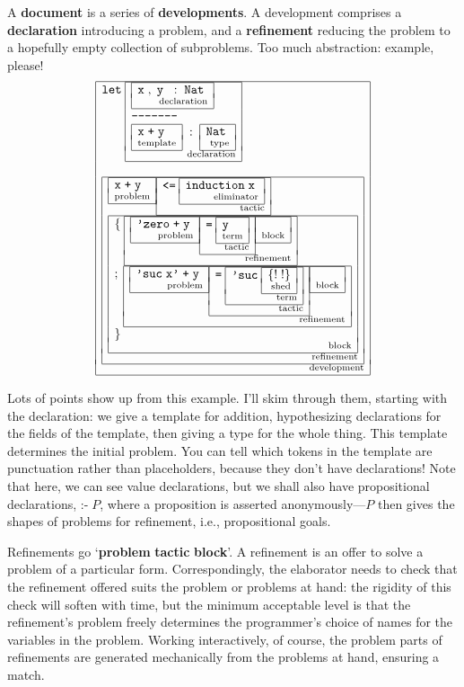 \documentclass{article}
\begin{document}
A \textbf{document} is a series of \textbf{developments}. A
development comprises a \textbf{declaration} introducing a problem,
and a \textbf{refinement} reducing the problem to a hopefully
empty collection of subproblems. Too much abstraction: example, please!
\newcommand{\capbox}[2]{\raisebox{0.12in}{\begin{array}[t]{|l|}\hline
      #1 \vspace*{-0.05in}\\
    \hfill\mbox{\scriptsize{#2}} \\ \hline\end{array}}}
\newcommand{\Ts}[1]{\texttt{#1}\;}
\newcommand{\co}{\;:\;}
\newcommand{\sco}{;\;\;}
\newcommand{\cm}{,\;}
\[
\capbox{
  \Ts{let}
    \capbox{
      \capbox{\Ts{x} \cm \Ts{y}\co \Ts{Nat}}{declaration}\\
      \Ts{--------------}\\
      \capbox{\Ts{x} \Ts{+} \Ts{y}}{template} \co \capbox{\Ts{Nat}}{type}
      }
      {declaration}\\ \\
  \capbox{
     \capbox{\Ts{x}\Ts{+}\Ts{y}}{problem}
       \capbox{\Ts{<=}\capbox{\Ts{induction}\Ts{x}}{eliminator}}{tactic}\\
     \capbox{
      \{\;\capbox{\capbox{\Ts{'zero}\Ts{+}\Ts{y}}{problem}
                  \capbox{\Ts{=} \capbox{\Ts{y}}{term}}{tactic}
                  \capbox{}{block}
          }{refinement}\\
      ;\;\capbox{\capbox{\Ts{'suc}\Ts{x'}\Ts{+}\Ts{y}}{problem}
                 \capbox{\Ts{=} \capbox{\Ts{'suc}
                   \capbox{\{!\;!\}}{shed}}{term}}{tactic}
                  \capbox{}{block}
         }{refinement}\\
      \}
      }{block}
    }
    {refinement}}
    {development}
\]

Lots of points show up from this example. I'll skim through them,
starting with the declaration: we give a template for addition,
hypothesizing declarations for the fields of the template, then giving
a type for the whole thing. This template determines the initial
problem. You can tell which tokens in the template are punctuation
rather than placeholders, because they don't have declarations!
Note that here, we can see value declarations, but we shall also have
propositional declarations, \(\texttt{:-}\;P\), where a proposition is
asserted anonymously---\(P\) then gives the shapes of problems for
refinement, i.e., propositional goals.

Refinements go `\textbf{problem} \textbf{tactic} \textbf{block}'. A
refinement is an offer to solve a problem of a particular form.
Correspondingly, the elaborator needs to check that the refinement
offered suits the problem or problems at hand: the rigidity of this
check will soften with time, but the minimum acceptable level is that
the refinement's problem freely determines the programmer's choice of
names for the variables in the problem. Working interactively, of course,
the problem parts of refinements are generated mechanically from the
problems at hand, ensuring a match.
\end{document}
